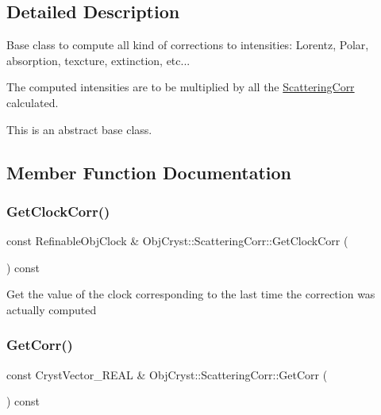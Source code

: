 \subsection{Detailed Description}
Base class to compute all kind of corrections to intensities\+: Lorentz, Polar, absorption, texcture, extinction, etc...

The computed intensities are to be multiplied by all the \mbox{\hyperlink{class_obj_cryst_1_1_scattering_corr}{Scattering\+Corr}} calculated.

This is an abstract base class. 

\subsection{Member Function Documentation}
\mbox{\label{class_obj_cryst_1_1_scattering_corr_abc7dc22888637bc062f2124694005404}} 
\subsubsection{\texorpdfstring{GetClockCorr()}{GetClockCorr()}}
{\footnotesize\ttfamily const Refinable\+Obj\+Clock \& Obj\+Cryst\+::\+Scattering\+Corr\+::\+Get\+Clock\+Corr (\begin{DoxyParamCaption}{ }\end{DoxyParamCaption}) const}

Get the value of the clock corresponding to the last time the correction was actually computed \mbox{\label{class_obj_cryst_1_1_scattering_corr_a984d75f2c772be383be38cb393183281}} 
\subsubsection{\texorpdfstring{GetCorr()}{GetCorr()}}
{\footnotesize\ttfamily const Cryst\+Vector\+\_\+\+R\+E\+AL \& Obj\+Cryst\+::\+Scattering\+Corr\+::\+Get\+Corr (\begin{DoxyParamCaption}{ }\end{DoxyParamCaption}) const}

